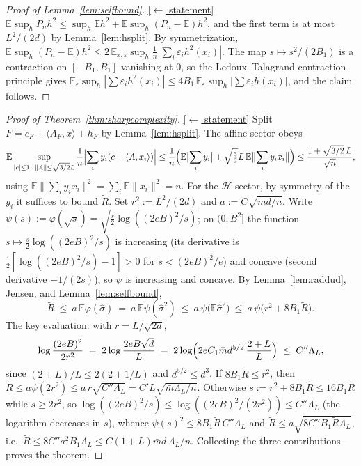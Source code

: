 \documentclass[11pt,reqno]{amsart}
\theoremstyle{plain}
\theoremstyle{definition}
\theoremstyle{remark}
\newcommand{\EE}{\mathbb{E}}
\newcommand{\inn}[2]{\langle #1,#2\rangle}
\newcommand{\stmtbutton}[1]{\hyperref[#1]{\textnormal{\footnotesize\textsf{[$\leftarrow$ statement]}}}}
\begin{document}
\begin{proof}[Proof of Lemma~\textup{\ref{lem:selfbound}}]\label{proof:selfbound}\stmtbutton{lem:selfbound}
$\EE\sup_hP_nh^2\le\sup_h\EE h^2+\EE\sup_h(P_n-\EE)h^2$, and the first term is at most $L^2/(2d)$ by Lemma~\ref{lem:hsplit}. By symmetrization, $\EE\sup_h(P_n-\EE)h^2\le2\,\EE_{x,\varepsilon}\sup_h\tfrac1n|\sum_i\varepsilon_ih^2(x_i)|$. The map $s\mapsto s^2/(2B_1)$ is a contraction on $[-B_1,B_1]$ vanishing at $0$, so the Ledoux--Talagrand contraction principle \cite[Thm.~4.12]{LT} gives $\EE_\varepsilon\sup_h|\sum\varepsilon_ih^2(x_i)|\le4B_1\,\EE_\varepsilon\sup_h|\sum\varepsilon_ih(x_i)|$, and the claim follows.
\end{proof}

\begin{proof}[Proof of Theorem~\textup{\ref{thm:sharpcomplexity}}]\label{proof:sharpcomplexity}\stmtbutton{thm:sharpcomplexity}
Split $F=c_F+\inn{A_F}{x}+h_F$ by Lemma~\ref{lem:hsplit}. The affine sector obeys
\[
\EE\sup_{|c|\le1,\ \|A\|\le\sqrt{3/2}L}\frac1n\Bigl|\sum_iy_i(c+\inn A{x_i})\Bigr|\le\frac1n\Bigl(\EE\bigl|\sum_iy_i\bigr|+\sqrt{\tfrac32}L\,\EE\bigl\|\sum_iy_ix_i\bigr\|\Bigr)\le\frac{1+\sqrt{3/2}\,L}{\sqrt n},
\]
using $\EE\|\sum_iy_ix_i\|^2=\sum_i\EE\|x_i\|^2=n$. For the $\mathcal H$-sector, by symmetry of the $y_i$ it suffices to bound $\widetilde R$. Set $r^2:=L^2/(2d)$ and $a:=C\sqrt{\bar md/n}$. Write $\psi(s):=\varphi(\sqrt s)=\sqrt{\tfrac s2\log((2eB)^2/s)}$; on $(0,B^2]$ the function $s\mapsto\tfrac s2\log((2eB)^2/s)$ is increasing (its derivative is $\tfrac12[\log((2eB)^2/s)-1]>0$ for $s<(2eB)^2/e$) and concave (second derivative $-1/(2s)$), so $\psi$ is increasing and concave. By Lemma~\ref{lem:raddud}, Jensen, and Lemma~\ref{lem:selfbound},
\[
\widetilde R\ \le\ a\,\EE\varphi(\hat\sigma)\ =\ a\,\EE\psi(\hat\sigma^2)\ \le\ a\,\psi\bigl(\EE\hat\sigma^2\bigr)\ \le\ a\,\psi\bigl(r^2+8B_1\widetilde R\bigr).
\]
The key evaluation: with $r=L/\sqrt{2d}$,
\[
\log\frac{(2eB)^2}{2r^2}\;=\;2\log\frac{2eB\sqrt d}{L}\;=\;2\log\Bigl(2eC_1\bar md^{5/2}\,\frac{2+L}{L}\Bigr)\;\le\;C''\Lambda_L,
\]
since $(2+L)/L\le2(2+1/L)$ and $d^{5/2}\le d^3$. If $8B_1\widetilde R\le r^2$, then $\widetilde R\le a\psi(2r^2)\le a\,r\sqrt{C''\Lambda_L}=C'L\sqrt{\bar m\Lambda_L/n}$. Otherwise $s:=r^2+8B_1\widetilde R\le16B_1\widetilde R$ while $s\ge2r^2$, so $\log((2eB)^2/s)\le\log((2eB)^2/(2r^2))\le C''\Lambda_L$ (the logarithm decreases in $s$), whence $\psi(s)^2\le8B_1\widetilde R\,C''\Lambda_L$ and $\widetilde R\le a\sqrt{8C''B_1\widetilde R\Lambda_L}$, i.e.\ $\widetilde R\le8C''a^2B_1\Lambda_L\le C(1+L)\bar md\,\Lambda_L/n$. Collecting the three contributions proves the theorem.
\end{proof}
\end{document}
